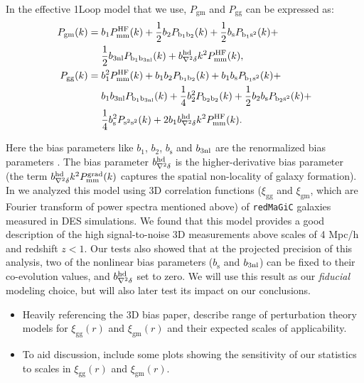 \documentclass[fleqn,usenatbib]{mnras}
\newcommand{\xigg}{\ensuremath{\xi_{\mathrm{gg}}} }
\newcommand{\xigm}{\ensuremath{\xi_{\mathrm{gm}}} }
\newcommand{\redmagic}{\texttt{redMaGiC} }
\begin{document}
In the effective 1Loop model that we use, $P_{\mathrm{gm}}$ and $P_{\mathrm{gg}}$ can be expressed as:
\begin{align}\label{eq:P_gg_gm}
    P_{\mathrm{gm}}(k) &= b_1 P^{\rm HF}_{\mathrm{mm}}(k) +  \frac{1}{2} b_2 P_{\rm b_1 b_2}(k) + \frac{1}{2} b_{\mathrm{s}} P_{\rm b_1 s^2}(k)  +  \nonumber \\
    &\mathrel{\phantom{=}} \frac{1}{2} b_{\rm 3nl}P_{\rm b_1 b_{\rm 3nl} }(k) + b^{\rm hd}_{\nabla^2 \delta} k^2 P^{\rm HF}_{\mathrm{mm}}(k) , \\
    P_{\mathrm{gg}}(k) &= b_1^2 P^{\rm HF}_{\mathrm{mm}}(k) + b_1 b_2 P_{\rm b_1 b_2}(k) + b_1 b_{\mathrm{s}}P_{\rm b_1 s^2}(k) +  \nonumber \\
    &\mathrel{\phantom{=}} b_1b_{\rm 3nl} P_{\rm b_1 b_{\rm 3nl} }(k) + \frac{1}{4}b_2^2 P_{\rm b_2 b_2}(k) + \frac{1}{2} b_2 b_{\mathrm{s}}P_{\rm b_2 s^2}(k) + \nonumber \\ 
    &\mathrel{\phantom{=}} \frac{1}{4} b^2_{\mathrm{s}} P_{\rm s^2 s^2}(k) + 2 b_1  b^{\rm hd}_{\nabla^2 \delta} k^2 P^{\rm HF}_{\mathrm{mm}}(k) .  
\end{align}

Here the bias parameters like $ b_1 $, $ b_2 $,	$ b_{\mathrm{s}} $ and $ b_{\rm 3nl} $ are the renormalized bias parameters \citep{McDonald2009}. The bias parameter $b^{\rm hd}_{\nabla^2 \delta}$ is the higher-derivative bias parameter (the term $b^{\rm hd}_{\nabla^2 \delta} k^2 P^{\rm grad}_{\mathrm{mm}}(k)$ captures the spatial non-locality of galaxy formation). In \cite{Pandey:inprep} we analyzed this model using 3D correlation functions ($\xigg$ and $\xigm$, which are Fourier transform of power spectra mentioned above) of \redmagic galaxies measured in DES simulations. We found that this model provides a good description of the high signal-to-noise 3D measurements above scales of 4 Mpc/h and redshift $z < 1$. Our tests also showed that at the projected precision of this analysis, two of the nonlinear bias parameters ($ b_{\mathrm{s}} $ and $ b_{\rm 3nl} $) can be fixed to their co-evolution values, and $b^{\rm hd}_{\nabla^2 \delta}$ set to zero. We will use this result as our \textit{fiducial} modeling choice, but will also later test its impact on our conclusions. 

\begin{itemize}
    \item Heavily referencing the 3D bias paper, describe range of perturbation theory models for $\xigg(r)$ and $\xigm(r)$ and their expected scales of applicability. 
    \item To aid discussion, include some plots showing the sensitivity of our statistics to scales in $\xigg(r)$ and $\xigm(r)$.
    
\end{itemize}
\end{document}
